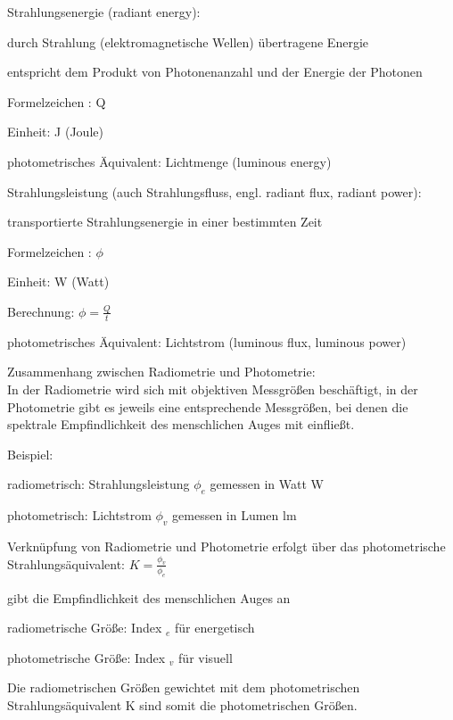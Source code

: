 \documentclass[landscape]{article}
\begin{document}
\begin{multicols}{3}
  Strahlungsenergie (radiant energy):
  \begin{itemize*}
    \item durch Strahlung (elektromagnetische Wellen) übertragene Energie
    \item entspricht dem Produkt von Photonenanzahl und der Energie der Photonen
    \item Formelzeichen : Q
    \item Einheit: J (Joule)
    \item photometrisches Äquivalent: Lichtmenge (luminous energy)
  \end{itemize*}
  
  Strahlungsleistung (auch Strahlungsfluss, engl. radiant flux, radiant power):
  \begin{itemize*}
    \item transportierte Strahlungsenergie in einer bestimmten Zeit
    \item Formelzeichen : $\phi$
    \item Einheit: W (Watt)
    \item Berechnung: $\phi = \frac{Q}{t}$
    \item photometrisches Äquivalent: Lichtstrom (luminous flux, luminous power)
  \end{itemize*}
  
  Zusammenhang zwischen Radiometrie und Photometrie:\\
  In der Radiometrie wird sich mit objektiven Messgrößen beschäftigt, in der Photometrie gibt es jeweils eine entsprechende Messgrößen, bei denen die spektrale Empfindlichkeit des menschlichen Auges mit einfließt.
  \begin{itemize*}
    \item Beispiel:
    \item radiometrisch: Strahlungsleistung $\phi_e$ gemessen in Watt W
    \item photometrisch: Lichtstrom $\phi_v$ gemessen in Lumen lm
    \item Verknüpfung von Radiometrie und Photometrie erfolgt über das photometrische Strahlungsäquivalent: $K =\frac{\phi_v}{\phi_e}$
    \item gibt die Empfindlichkeit des menschlichen Auges an
    \item radiometrische Größe: Index $_e$ für energetisch
    \item photometrische Größe: Index $_v$ für visuell
  \end{itemize*}
  Die radiometrischen Größen gewichtet mit dem photometrischen Strahlungsäquivalent K sind somit die photometrischen Größen.
  

\end{multicols}
\end{document}
